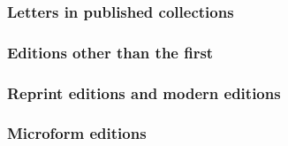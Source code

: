 \documentclass[11pt,letterpaper,oneside]{article}
\begin{document}
\begin{citebib}
\item \cite{morrison2004b.f}
\item \cite{mansfield2000}
\end{citebib}

\subsubsection{Letters in published collections}

\begin{citebib}
\item \cite[133--34]{adams1867}
\item \cite{jackson1676}
\end{citebib}

\setcounter{subsubsection}{112}
\subsubsection{Editions other than the first}

\begin{citebib}
\item \cite[401--2]{einsohn2011}
\item \cite[101]{boudett2013}
\item \cite{strunk2000}
\end{citebib}

\subsubsection{Reprint editions and modern editions}


\begin{citebib}
\item \cite[152--53]{barzun1994}
\item \cite{bahadur2014}
\item \cite{emerson1985}
\item \cite{schweitzer1966}
\end{citebib}

\subsubsection{Microform editions}
\end{document}
